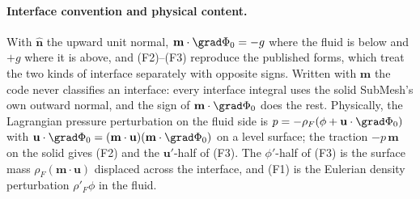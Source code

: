 \documentclass[11pt]{article}
\numberwithin{equation}{section}
\theoremstyle{remark}
\newcommand{\vu}{\mathbf{u}}
\newcommand{\vm}{\mathbf{m}}
\newcommand{\vn}{\hat{\mathbf{n}}}
\begin{document}
\paragraph{Interface convention and physical content.} With $\vn$ the
upward unit normal, $\vm\cdot\grad\Phi_0 = -g$ where
the fluid is below and $+g$ where it is above, and (F2)--(F3) reproduce the
published forms, which treat the two kinds of interface separately with
opposite signs. Written with $\vm$ the code never classifies an interface:
every interface integral uses the solid SubMesh's own outward normal, and
the sign of $\vm\cdot\grad\Phi_0$ does the rest. Physically, the
Lagrangian pressure perturbation on the fluid side is $p = -\rho_F(\phi +
\vu\cdot\grad\Phi_0)$ with $\vu\cdot\grad\Phi_0 = (\vm\cdot\vu)
(\vm\cdot\grad\Phi_0)$ on a level surface; the traction $-p\,\vm$ on the
solid gives (F2) and the $\vu'$-half of (F3). The $\phi'$-half of (F3) is
the surface mass $\rho_F(\vm\cdot\vu)$ displaced across the interface, and
(F1) is the Eulerian density perturbation $\rho'_F\phi$ in the fluid.
\end{document}
